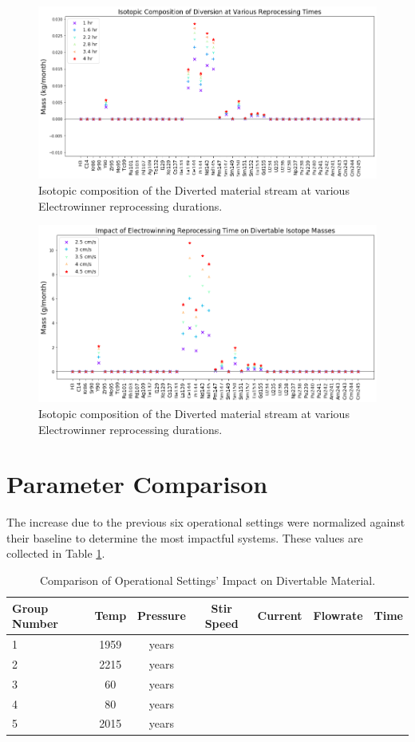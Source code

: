 \begin{figure}
	\includegraphics[width=\linewidth]{images/time-sa-comp}
	\caption{Isotopic composition of the Diverted material stream at various Electrowinner reprocessing durations.}
	\label{fig:win-time-sa}
\end{figure}

\begin{figure}
	\includegraphics[width=\linewidth]{images/time-sa-diff}
	\caption{Isotopic composition of the Diverted material stream at various Electrowinner reprocessing durations.}
	\label{fig:win-time-diff}
\end{figure}

\section{Parameter Comparison}

The increase due to the previous six operational settings were normalized against their baseline
to determine the most impactful systems. These values are collected in Table \ref{tab:compare}.

\begin{table}[h]
	\centering
	\begin{tabularx}{\linewidth}{lcccccc}
		\hline
		\textbf{Group Number} & \textbf{Temp} & \textbf{Pressure} & \textbf{Stir Speed} & \textbf{Current}
		& \textbf{Flowrate} & \textbf{Time} \\
		\hline \hline
		1 & 1959 & years \\ \hline
		2 & 2215 & years \\ \hline
		3 & 60 & years \\ 
		4 & 80 & years \\ \hline
		5 & 2015 & years \\ \hline
	\end{tabularx}
	\caption {Comparison of Operational Settings' Impact on Divertable Material.}
	\label {tab:compare}
\end{table}